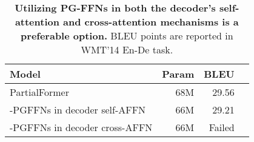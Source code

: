 \documentclass[11pt]{article}
\begin{document}
\begin{table}[t!]
    \centering
    \renewcommand{\arraystretch}{1}
\centering
\small

\setlength{\tabcolsep}{1pt}
\begin{tabular}{lrrr}
\toprule
\bf Model  & \bf Param & \bf BLEU  \\
\midrule
PartialFormer		&68M	&29.56	 \\
\quad -PGFFNs in decoder self-AFFN		 &66M	& 29.21
\\
\quad -PGFFNs in decoder cross-AFFN		 &66M	& Failed \\
\bottomrule
\end{tabular}
    \caption{\textbf{Utilizing PG-FFNs in both the decoder's self-attention and cross-attention mechanisms is a preferable option.} BLEU points are reported in WMT'14 En-De task. }
    \label{tab:result_PG_FFNs_compare}
\end{table}











\begin{table}[t!]
\renewcommand{\arraystretch}{1}
\centering
\small
\setlength{\tabcolsep}{1.5pt}


    \caption{Comparison with state-of-the-art models of smaller capacities on the En-De task. }
    \label{tab:result_comparision_small}
\end{table}
\end{document}
